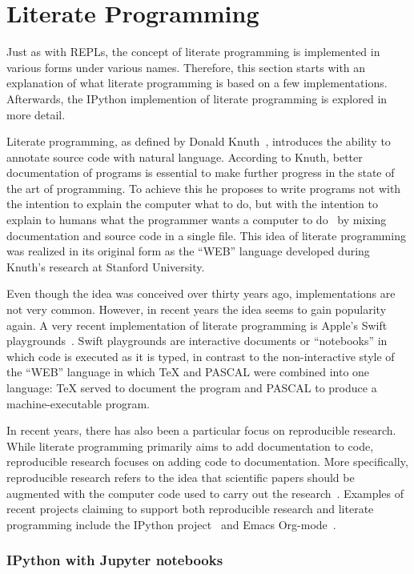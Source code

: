 \section{Literate Programming}
\label{sec:literate-programming}

Just as with REPLs, the concept of literate programming is implemented in
various forms under various names. Therefore, this section starts with an
explanation of what literate programming is based on a few implementations.
Afterwards, the IPython implemention of literate programming is explored in more
detail.

Literate programming, as defined by Donald Knuth~\cite{knuth1984}, introduces
the ability to annotate source code with natural language. According to Knuth,
better documentation of programs is essential to make further progress in the
state of the art of programming.  To achieve this he proposes to write programs
not with the intention to explain the computer what to do, but with the
intention to explain to humans what the programmer wants a computer to
do~\cite{knuth1984} by mixing documentation and source code in a single file.
This idea of literate programming was realized in its original form as the
``WEB'' language developed during Knuth's research at Stanford University.

Even though the idea was conceived over thirty years ago, implementations are not
very common. However, in recent years the idea seems to gain popularity again.
A very recent implementation of literate programming is Apple's Swift
playgrounds~\cite{swift-playgrounds}. Swift playgrounds are interactive
documents or ``notebooks'' in which code is executed as it is typed, in
contrast to the non-interactive style of the ``WEB'' language in which \TeX{} and
PASCAL were combined into one language: \TeX{} served to document the program
and PASCAL to produce a machine-executable program.

In recent years, there has also been a particular focus on reproducible
research. While literate programming primarily aims to add documentation to
code, reproducible research focuses on adding code to documentation. More
specifically, reproducible research refers to the idea that scientific papers
should be augmented with the computer code used to carry out the
research~\cite{schulte2012}. Examples of recent projects claiming to support
both reproducible research and literate programming include the IPython
project~\cite{ipython2007} and Emacs Org-mode~\cite{schulte2012}.

\subsubsection{IPython with Jupyter notebooks}

